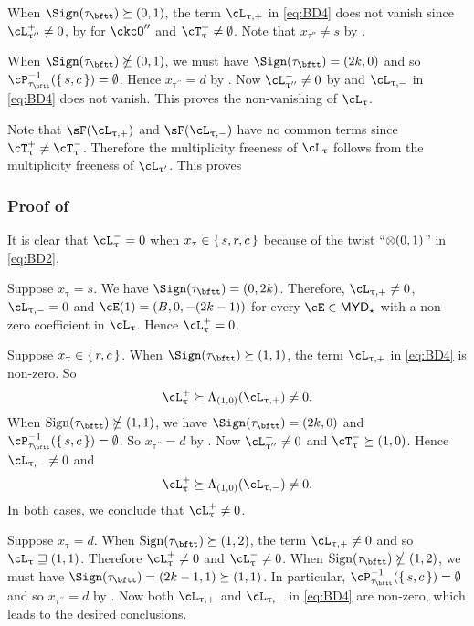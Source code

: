 \documentclass[12pt,a4paper]{amsart}
\def\MYD{{\mathsf{MYD}}}
\numberwithin{equation}{section}
\theoremstyle{remark}
\def\ssign{\mathrm{Sign}}
\def\ncL{\cL^-}
\def\uptaupp{\uptau^{\prime\prime}}
\begin{document}
When $\Sign(\tau_{\bftt})\succeq (0,1)$, the term $\ppac{\uptau}$ in \eqref{eq:BD4} does 
not vanish since $\pac{\uptaupp}\neq 0$, by  for $\ckcO''$ and $\pcT_{\uptau}\neq \emptyset$. Note that $x_{\tau''}\neq s$ by .

When $\Sign(\tau_{\bftt})\nsucceq (0,1)$, we must have $\Sign(\tau_{\bftt}) =
(2k,0)$ and so $\cP_{\tau_{\bftt}}^{-1}(\set{s,c})=\emptyset$. Hence
$x_{\uptaupp}=d$ by . Now $\nac{\uptaupp} \neq 0$ by
 and $\nnac{\uptau}$  in \eqref{eq:BD4} does not vanish.
This proves the non-vanishing of $\ac_{\uptau}$.

Note that
$\sF(\ppac{\uptau})$ and $\sF(\nnac{\uptau})$ have no common terms since
$\pcT_{\uptau}\neq \ncT_{\uptau}$. Therefore the multiplicity freeness of
$\ac_{\uptau}$ follows from the multiplicity freeness of $\ac_{\uptau'}$.
This proves 


\subsubsection*{Proof of  }

It is clear that $\nac{\uptau}=0$ when $x_{\tau}\in \set{s,r,c}$ because of
the twist ``$\otimes(0, 1)$'' in \eqref{eq:BD2}.

  \begin{enuma}
    \item Suppose $x_{\uptau}=s$. We have $\Sign(\tau_{\bftt})=(0,2k)$.
    Therefore,  $\ppac{\uptau}\neq 0$, $\nnac{\uptau}=0$ and $\cE(1) =
    (B,0,-(2k-1))$ for every $\cE\in \MYD_{\star}$ with a non-zero coefficient in
    $\ac_{\uptau}$. Hence $\pac{\uptau}=0$.
    \item Suppose $x_{\uptau} \in \set{r,c}$. When
    $\Sign(\tau_{\bftt})\succeq (1,1)$, the term $\ppac{\uptau}$ in \eqref{eq:BD4} is
    non-zero.
    So
    \[
    \pac{\uptau}\succeq \Lambda_{(1,0)} (\ppac{\uptau}) \neq 0.
    \]
    When $\ssign(\tau_{\bftt})\nsucceq (1,1)$,  we have $\Sign(\tau_{\bftt})=(2k,0)$
    and $\cP_{\tau_{\bftt}}^{-1}(\set{s,c})=\emptyset$.
    So $x_{\uptaupp}=d$ by . Now $\ncL_{\uptau''}\neq 0$
    and $\ncT_{\uptau}\succeq (1,0)$.
    Hence  $\nnac{\uptau}\neq 0$ and
    \[
    \pac{\uptau}\succeq \Lambda_{(1,0)} (\nnac{\uptau}) \neq 0.
    \]
    In both cases, we conclude that $\pac{\uptau}\neq 0$.
    \item Suppose $x_{\uptau}=d$. When $\ssign(\tau_{\bftt})\succeq (1,2)$,
    the term $\ppac{\uptau}\neq 0$ and so
    $\ac_{\uptau}\sqsupseteq (1,1)$. Therefore $\pac{\uptau}\neq 0$ and
    $\nac{\uptau}\neq 0$.
    When $\ssign(\tau_{\bftt})\nsucceq(1,2)$, we must have  $\Sign(\tau_{\bftt}) = (2k-1,1)\succeq (1,1)$.
    In particular, $\cP_{\tau_{\bftt}}^{-1}(\set{s,c})=\emptyset$ and
    so $x_{\uptaupp}=d$ by .
    Now both $\ppac{\uptau}$ and $\nnac{\uptau}$ in \eqref{eq:BD4} are non-zero, which leads to the desired conclusions.
  \end{enuma}
\end{document}
